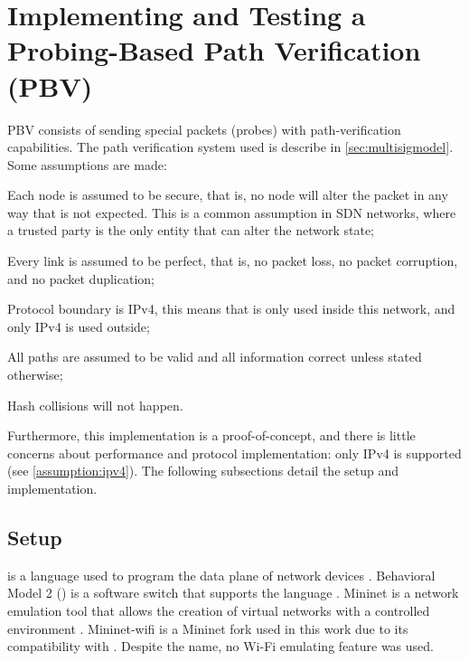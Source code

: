
\section{Implementing and Testing a Probing-Based Path Verification (PBV)} \label{sec:implementation}

PBV consists of sending special packets (probes) with path-verification capabilities. The path verification system used is describe in \autoref{sec:multisigmodel}. Some assumptions are made:
\begin{inlinelist}
    \item Each node is assumed to be secure, that is, no node will alter the packet in any way that is not expected. This is a common assumption in SDN networks, where a trusted party is the only entity that can alter the network state;
    \item  Every link is assumed to be perfect, that is, no packet loss, no packet corruption, and no packet duplication;
    \item  Protocol boundary is IPv4, this means that 
    \pathsec is only used inside this network, and only IPv4 is used outside; \label{assumption:ipv4}
    \item All paths are assumed to be valid and all information correct unless stated otherwise;
    \item Hash collisions will not happen.
\end{inlinelist}
Furthermore, this implementation is a proof-of-concept, and there is little concerns about performance and protocol implementation: only IPv4 is supported (see \autoref{assumption:ipv4}). The following subsections detail the setup and implementation.

\subsection{Setup}

\pIV is a language used to program the data plane of network devices \cite{p4}. Behavioral Model 2 (\bmv) is a software switch that supports the \pIV language \cite{bmv2}. Mininet is a network emulation tool that allows the creation of virtual networks with a controlled environment \cite{mininet}. Mininet-wifi\cite{mininet-wifi} is a Mininet fork used in this work due to its compatibility with \bmv. Despite the name, no Wi-Fi emulating feature was used.

